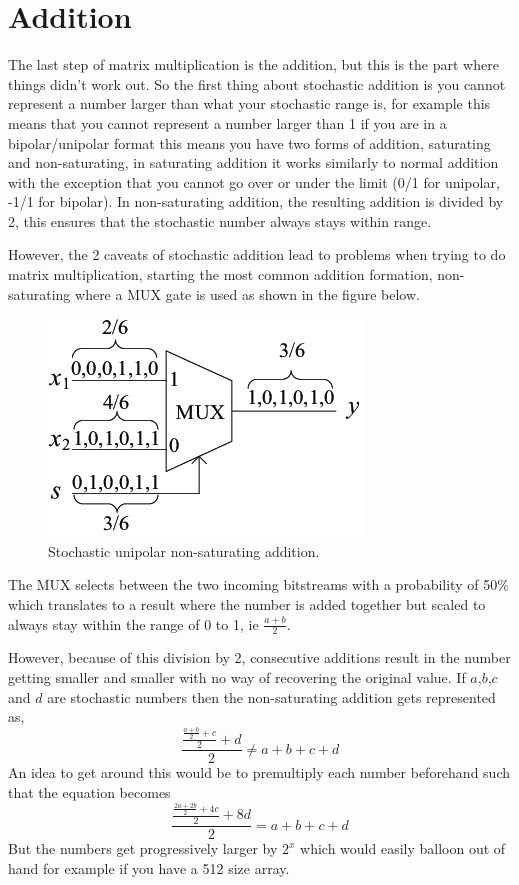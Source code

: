 \documentclass[a4paper,oneside,phd,etd]{BYUPhys}
\begin{document}
\section{Addition}
The last step of matrix multiplication is the addition, but this is the part where things didn't work out. So the first thing about stochastic addition is you cannot represent a number larger than what your stochastic range is, for example this means that you cannot represent a number larger than 1 if you are in a bipolar/unipolar format this means you have two forms of addition, saturating and non-saturating, in saturating addition it works similarly to normal addition with the exception that you cannot go over or under the limit (0/1 for unipolar, -1/1 for bipolar). In non-saturating addition, the resulting addition is divided by 2, this ensures that the stochastic number always stays within range.

However, the 2 caveats of stochastic addition lead to problems when trying to do matrix multiplication, starting the most common addition formation, non-saturating where a MUX gate is used as shown in the figure below.
\begin{figure}[H]
\centering
\includegraphics[scale=2]{pictures/add.png}
\caption{Stochastic unipolar non-saturating addition\cite{fig:multiplyslashadd}.}
\label{fig:multiplyslashadd}
\end{figure}
The MUX selects between the two incoming bitstreams with a probability of 50\% which translates to a result where the number is added together but scaled to always stay within the range of 0 to 1, ie $\frac{a+b}{2}$.

However, because of this division by 2, consecutive additions result in the number getting smaller and smaller with no way of recovering the original value.
If $a$,$b$,$c$ and $d$ are stochastic numbers then the non-saturating addition gets represented as,
$$\frac{\frac{\frac{a+b}{2}+c}{2}+d}{2} \neq a+b+c+d$$
An idea to get around this would be to premultiply each number beforehand such that the equation becomes
$$\frac{\frac{\frac{2a+2b}{2}+4c}{2}+8d}{2} = a+b+c+d$$
But the numbers get progressively larger by $2^x$ which would easily balloon out of hand for example if you have a 512 size array.
\end{document}

